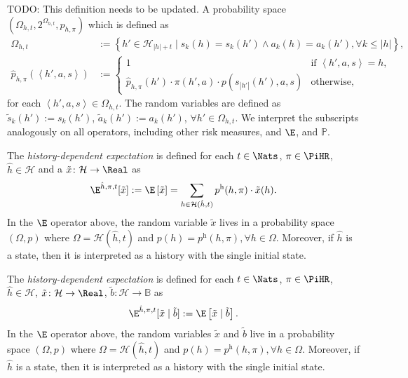 TODO: This definition needs to be updated. 
A probability space $(\Omega_{h,t}, 2^{\Omega_{h,t} }, \hat{p}_{h,\pi})$ which is defined as
\begin{align}
\label{eq:omega-def}
  \Omega_{h,t} &:= \left\{ h' \in \mathcal{H}_{|h| + t} \mid s_k(h) = s_k(h') \wedge a_k(h) = a_k(h'), \forall k \le |h| \right\}, \\
  \label{eq:phat-def}
\hat{p}_{h,\pi}\left(\left< h', a, s \right>\right)
&:= \begin{cases}
1 &\text{if } \left< h', a, s \right> = h, \\
\hat{p}_{h,\pi}(h') \cdot  \pi(h', a) \cdot p(s_{|h'|}(h'), a, s)
&\text{otherwise},
\end{cases}
\end{align}
for each $\left< h', a, s \right> \in \Omega_{h,t}$. The random variables are defined as $\tilde{s}_k(h') := s_k(h')$, $\tilde{a}_k(h') := a_k(h')$, $\forall h'\in \Omega_{h,t}$. We interpret the subscripts analogously on all operators, including other risk measures, and $\E$, and $\mathbb{P}$.



\begin{definition}\label{def:expect-h}
The \emph{history-dependent expectation} is defined for each $t\in \Nats$, $\pi\in \PiHR$, $\hat{h}\in \mathcal{H}$ and a $\tilde{x}\colon \mathcal{H} \to \Real$ as
\begin{equation*}
\E^{\hat{h}, \pi, t} [\tilde{x}]
:= \E \left[ \tilde{x} \right] 
= \sum_{h \in \mathcal{H}(\hat{h}, t)} p^{\mathrm{h}}(h, \pi) \cdot \tilde{x}(h).
\end{equation*}
In the $\E$ operator above, the random variable $\tilde{x}$ lives in a probability space $(\Omega, p)$ where $\Omega = \mathcal{H}(\hat{h}, t)$ and $p(h) = p^{\mathrm{h}}(h, \pi), \forall h\in \Omega$.
Moreover, if $\hat{h}$ is a state, then it is interpreted as a history with the single initial state.
\end{definition}


\begin{definition}\label{def:expect-h-cnd}
The \emph{history-dependent expectation} is defined for each $t\in \Nats$, $\pi\in \PiHR$, $\hat{h}\in \mathcal{H}$, $\tilde{x}\colon \mathcal{H} \to \Real$, $\tilde{b}\colon \mathcal{H} \to \mathcal{\mathbb{B}}$ as
\begin{equation*}
\E^{\hat{h}, \pi, t} [\tilde{x} \mid \tilde{b} ]
:= \E \left[ \tilde{x} \mid  \tilde{b} \right].
\end{equation*}
In the $\E$ operator above, the random variables $\tilde{x}$ and $\tilde{b}$ live in a probability space $(\Omega, p)$ where $\Omega = \mathcal{H}(\hat{h}, t)$ and $p(h) = p^{\mathrm{h}}(h, \pi), \forall h\in \Omega$.
Moreover, if $\hat{h}$ is a state, then it is interpreted as a history with the single initial state.
\end{definition}

